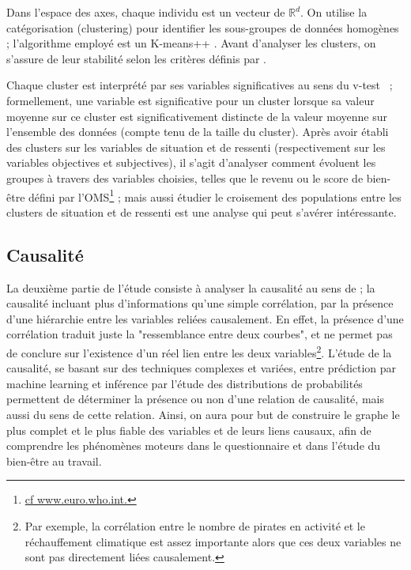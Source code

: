 \documentclass[11pt,fleqn,a4paper,openany,frenchb]{book} %
\begin{document}
Dans l'espace des axes, chaque individu est un vecteur de $\mathbb{R}^d$. On utilise la catégorisation (clustering) pour identifier les sous-groupes de données homogènes ; l'algorithme employé est un K-means++ \cite{arthur2007k}. Avant d'analyser les clusters, on s'assure de leur stabilité selon les critères définis par \cite{meilua2006uniqueness}. \par

Chaque cluster est interprété par ses variables significatives au sens du v-test \cite{lebart2006statistique}~; formellement, une variable est significative pour un cluster lorsque sa valeur moyenne sur ce cluster est significativement distincte de la valeur moyenne sur l'ensemble des données (compte tenu de la taille du cluster). Après avoir établi des clusters sur les variables de  situation et de ressenti (respectivement sur les variables objectives et subjectives), il s'agit d'analyser comment évoluent les groupes à travers des variables choisies, telles que le revenu ou le score de bien-être défini par l'OMS\footnote{\href{http://www.euro.who.int/fr/publications/abstracts/measurement-of-and-target-setting-for-well-being-an-initiative-by-the-who-regional-office-for-europe}{cf www.euro.who.int.}} ; mais aussi étudier le croisement des populations entre les clusters de situation et de ressenti est une analyse qui peut s'avérer intéressante.\par

\subsection{Causalité}
La deuxième partie de l'étude consiste à analyser la causalité au sens de \cite{granger1969causality} ; la causalité incluant plus d'informations qu'une simple corrélation, par la présence d'une hiérarchie entre les variables reliées causalement. En effet, la présence d'une corrélation traduit juste la "ressemblance entre deux courbes", et ne permet pas de conclure sur l'existence d'un réel lien entre les deux variables\footnote{Par exemple, la corrélation entre le nombre de pirates en activité et le réchauffement climatique est assez importante alors que ces deux variables ne sont pas directement liées causalement.}. L'étude de la causalité, se basant sur des techniques complexes et variées, entre prédiction par machine learning et inférence par l'étude des distributions de probabilités permettent de déterminer la présence ou non d'une relation de causalité, mais aussi du sens de cette relation. Ainsi, on aura pour but de construire le graphe le plus complet et le plus fiable des variables et de leurs liens causaux, afin de comprendre les phénomènes moteurs dans le questionnaire et dans l'étude du bien-être au travail. \par %
\end{document}
